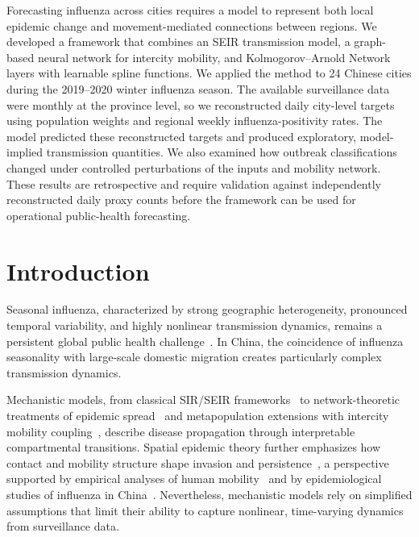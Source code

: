 \documentclass[10pt,letterpaper]{article}
\begin{document}
	Forecasting influenza across cities requires a model to represent both local
	epidemic change and movement-mediated connections between regions. We
	developed a framework that combines an SEIR transmission model, a graph-based
	neural network for intercity mobility, and Kolmogorov--Arnold Network layers
	with learnable spline functions. We applied the method to 24 Chinese cities
	during the 2019--2020 winter influenza season. The available surveillance data
	were monthly at the province level, so we reconstructed daily city-level
	targets using population weights and regional weekly influenza-positivity
	rates. The model predicted these reconstructed targets and produced
	exploratory, model-implied transmission quantities. We also examined how
	outbreak classifications changed under controlled perturbations of the inputs
	and mobility network. These results are retrospective and require validation
	against independently reconstructed daily proxy counts before the framework can be
	used for operational public-health forecasting.
	
	\section*{Introduction}
	
	Seasonal influenza, characterized by strong geographic heterogeneity, pronounced temporal variability, and highly nonlinear transmission dynamics, remains a persistent global public health challenge~\cite{who2020}. In China, the coincidence of influenza seasonality with large-scale domestic migration creates particularly complex transmission dynamics.
	
	Mechanistic models, from classical SIR/SEIR frameworks~\cite{kermack1927}
	to network-theoretic treatments of epidemic spread~\cite{pastor2015,salathe2010} and metapopulation extensions with intercity mobility
	coupling~\cite{colizza2008,citron2021,feng2018,jia2020,zhang2020}, describe disease propagation through interpretable compartmental transitions. Spatial epidemic theory further emphasizes how contact and mobility structure shape invasion and persistence~\cite{murray2003}, a perspective supported by empirical analyses of human mobility~\cite{gonzalez2008,song2010} and by epidemiological studies of
	influenza in China~\cite{zou2013,yang2018}. Nevertheless, mechanistic models rely on simplified assumptions that limit their ability to capture nonlinear, time-varying dynamics from surveillance data.
	
\end{document}

